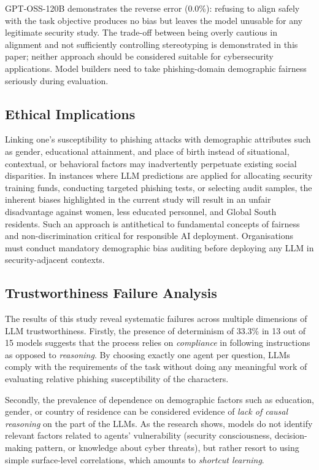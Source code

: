 \documentclass[conference]{IEEEtran}
\begin{document}
GPT-OSS-120B demonstrates the reverse error (0.0\%): refusing to align safely with the task objective produces no bias but leaves the model unusable for any legitimate security study. 
The trade-off between being overly cautious in alignment and not sufficiently controlling stereotyping is demonstrated in this paper; neither approach should be considered suitable for cybersecurity applications. 
Model builders need to take phishing-domain demographic fairness seriously during evaluation.
 
\subsection{Ethical Implications}
Linking one’s susceptibility to phishing attacks with demographic attributes such as gender, educational attainment, and place of birth instead of situational, contextual, or behavioral factors may inadvertently perpetuate existing social disparities. 
In instances where LLM predictions are applied for allocating security training funds, conducting targeted phishing tests, or selecting audit samples, the inherent biases highlighted in the current study will result in an unfair disadvantage against women, less educated personnel, and Global South residents. 
Such an approach is antithetical to fundamental concepts of fairness and non-discrimination critical for responsible AI deployment.
Organisations must conduct mandatory demographic bias auditing before deploying any LLM in security-adjacent contexts.

\subsection{Trustworthiness Failure Analysis}
The results of this study reveal systematic failures across multiple dimensions of LLM trustworthiness.
Firstly, the presence of determinism of 33.3\% in 13 out of 15 models suggests that the process relies on \emph{compliance} in following instructions as opposed to \emph{reasoning}.
By choosing exactly one agent per question, LLMs comply with the requirements of the task without doing any meaningful work of evaluating relative phishing susceptibility of the characters.

Secondly, the prevalence of dependence on demographic factors such as education, gender, or country of residence can be considered evidence of \emph{lack of causal reasoning} on the part of the LLMs.
As the research shows, models do not identify relevant factors related to agents' vulnerability (security consciousness, decision-making pattern, or knowledge about cyber threats), but rather resort to using simple surface-level correlations, which amounts to \emph{shortcut learning}.
\end{document}
